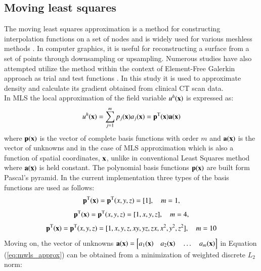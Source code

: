 \documentclass[11pt]{acmeArticle}
\numberwithin{equation}{section}
\begin{document}
\subsection{Moving least squares}
\label{sec:mwls}
The moving least squares approximation is a method for constructing interpolation functions on a set of nodes and is widely used for various meshless methods \citep{belytschko1996meshless}. In computer graphics, it is useful for reconstructing a surface from a set of points \citep{lancaster1981surfaces} through  downsampling or upsampling. Numerous studies have also attempted utilize the method within the context of Element-Free Galerkin approach as trial and test functions \citep{belytschko1996dynamic,wong2010meshfree, ullah2013finite}. In this study it is used to approximate density and calculate its gradient obtained from clinical CT scan data. \\
In MLS the local approximation of the field variable $u^h({\boldsymbol {\rm x}})$ is expressed as: 
\begin{equation}
u^h({\boldsymbol {\rm x}})=\sum^m_{j=1}p_j({\boldsymbol {\rm x}} )a_j({\boldsymbol {\rm x}} ) =\mathbf p^{\rm T}({\boldsymbol {\rm x}} )\mathbf a({\boldsymbol {\rm x}} )
\label{eq:mwls_approx}
\end{equation}
where $\mathbf p({\boldsymbol {\rm x}})$ is the vector of complete basis functions with order $m$ and $\mathbf a({\boldsymbol {\rm x}})$ is the vector of unknowns and in the case of MLS approximation which is also a function of spatial coordinates, ${\boldsymbol {\rm x}}$, unlike in conventional Least Squares method where $\mathbf a({\boldsymbol {\rm x}})$ is held constant. 
The polynomial basis functions $\mathbf p({\boldsymbol {\rm x}})$ are built form Pascal's pyramid. 
In the current implementation three types of the basis functions are used as follows:
\begin{equation*}
\mathbf p^{\rm T}({\boldsymbol {\rm x}})  = \mathbf p^{\rm T}(x,y,z)= [1], \quad m=1,
\end{equation*}
\begin{equation*}
\mathbf p^{\rm T}({\boldsymbol {\rm x}}) = \mathbf p^{\rm T}(x,y,z)= [1,x,y,z], \quad m=4,
\end{equation*}
\begin{equation}\label{eq:mwls_basis}
\mathbf p^{\rm T}({{\boldsymbol {\rm x}}}) = \mathbf p^{\rm T}(x,y,z)= [1,x,y,z,xy,yz,zx,x^2,y^2,z^2], \quad m=10
\end{equation}
Moving on, the vector of unknowns $\mathbf a({\boldsymbol {\rm x}}) = \Big[ a_1({\boldsymbol {\rm x}} )\quad a_2({\boldsymbol {\rm x}} )\quad\dots \quad a_m({\boldsymbol {\rm x}} ) \Big]$ in Equation (\ref{eq:mwls_approx}) can be obtained from a minimization of weighted discrete $L_2$ norm:
\end{document}
